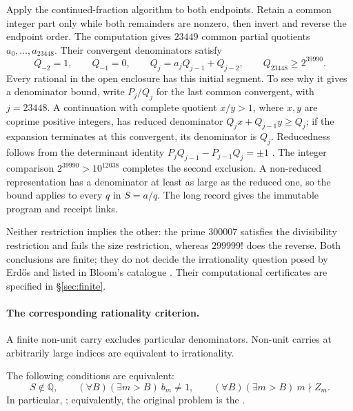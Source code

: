 \documentclass[11pt]{article}
\begin{document}
Apply the continued-fraction algorithm to both endpoints. Retain a common
integer part only while both remainders are nonzero, then invert and
reverse the endpoint order. The computation gives $23449$ common partial
quotients $a_0,\ldots,a_{23448}$. Their convergent denominators satisfy
\[
 Q_{-2}=1,\qquad Q_{-1}=0,\qquad
 Q_j=a_jQ_{j-1}+Q_{j-2},\qquad Q_{23448}\ge2^{39990}.
\]
Every rational in the open enclosure has this initial segment. To see why
it gives a denominator bound, write $P_j/Q_j$ for the last common
convergent, with $j=23448$. A continuation with complete quotient $x/y>1$, where $x,y$
are coprime positive integers, has reduced denominator $Q_jx+Q_{j-1}y\ge Q_j$; if the expansion terminates
at this convergent, its denominator is $Q_j$. Reducedness follows from
the determinant identity $P_jQ_{j-1}-P_{j-1}Q_j=\pm1$
\cite[\S1.12(ii), (1.12.5)--(1.12.7), (1.12.20)--(1.12.21)]{nist-dlmf}.
The integer comparison $2^{39990}>10^{12038}$ completes the second
exclusion. A non-reduced representation has a denominator at least as
large as the reduced one, so the bound applies to every $q$ in $S=a/q$. The long record gives the immutable program and receipt links.

Neither restriction implies the other: the prime $300007$
satisfies the divisibility restriction and fails the size restriction,
whereas $299999!$ does the reverse.  Both conclusions are finite; they do
not decide the irrationality question posed by Erd\H{o}s
\cite[p.~102]{erdos1988} and listed in Bloom's catalogue \cite{bloom}.
Their computational certificates are specified in \S\ref{sec:finite}.

\paragraph{The corresponding rationality criterion.}
A finite non-unit carry excludes particular denominators. Non-unit carries
at arbitrarily large indices are equivalent to irrationality.

\begin{theorem}
\label{res:carry-characterization}\label{res:strict-successor-complete-characterization}
The following conditions are equivalent:
\[
S\notin\mathbb Q,\qquad
(\forall B)(\exists m>B)\ b_m\ne1,\qquad
(\forall B)(\exists m>B)\ m\nmid Z_m.
\]
In particular,
;
equivalently, the original problem is the
.
\end{theorem}
\end{document}
